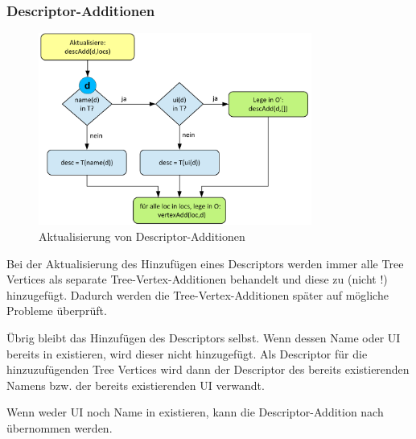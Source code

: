 \subsubsection{Descriptor-Additionen}

\begin{figure}[h]
\begin{center}
\includegraphics[width=0.8\textwidth]{figs/merge_descAdd.pdf}
\end{center}
\caption{Aktualisierung von Descriptor-Additionen}
\label{figs:merge_descAdd}
\end{figure}

Bei der Aktualisierung des Hinzufügen eines Descriptors werden immer alle Tree Vertices als separate Tree-Vertex-Additionen behandelt und diese zu  (nicht !) hinzugefügt. Dadurch werden die Tree-Vertex-Additionen später auf mögliche Probleme überprüft.\par

Übrig bleibt das Hinzufügen des Descriptors selbst. Wenn dessen Name oder UI bereits in  existieren, wird dieser nicht hinzugefügt. Als Descriptor für die hinzuzufügenden Tree Vertices wird dann der Descriptor des bereits existierenden Namens bzw. der bereits existierenden UI verwandt. \par

Wenn weder UI noch Name in  existieren, kann die Descriptor-Addition nach  übernommen werden.



